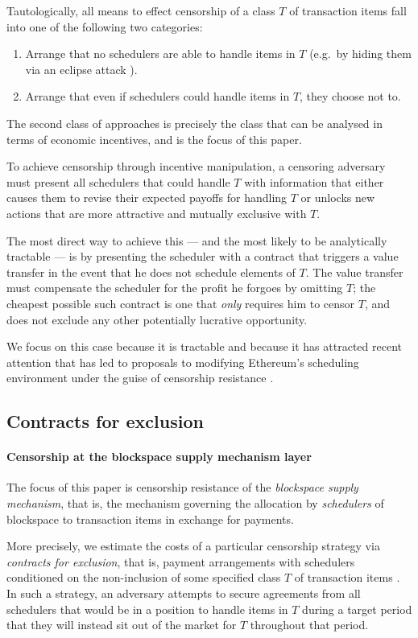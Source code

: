 Tautologically, all means to effect censorship of a class $T$ of transaction items fall into one of the following two categories:
%
\begin{enumerate}
  \item Arrange that no schedulers are able to handle items in $T$ (e.g.~by hiding them via an eclipse attack \cite{heilman2015eclipse}).
  \item Arrange that even if schedulers could handle items in $T$, they choose not to.
\end{enumerate}
%
The second class of approaches is precisely the class that can be analysed in terms of economic incentives, and is the focus of this paper.

To achieve censorship through incentive manipulation, a censoring adversary must present all schedulers that could handle $T$ with information that either causes them to revise their expected payoffs for handling $T$ or unlocks new actions that are more attractive and mutually exclusive with $T$.

The most direct way to achieve this --- and the most likely to be analytically tractable --- is by presenting the scheduler with a contract that triggers a value transfer in the event that he does not schedule elements of $T$.
%
The value transfer must compensate the scheduler for the profit he forgoes by omitting $T$; the cheapest possible such contract is one that \emph{only} requires him to censor $T$, and does not exclude any other potentially lucrative opportunity.

We focus on this case because it is tractable and because it has attracted recent attention \cite{FPR} that has led to proposals to modifying Ethereum's scheduling environment under the guise of censorship resistance \cite{burian2024censorship}.

\subsection{Contracts for exclusion}
\paragraph{Censorship at the blockspace supply mechanism layer}
The focus of this paper is censorship resistance of the \emph{blockspace supply mechanism}, that is, the mechanism governing the allocation by \emph{schedulers} of blockspace to transaction items in exchange for payments.

More precisely, we estimate the costs of a particular censorship strategy via \emph{contracts for exclusion}, that is, payment arrangements with schedulers conditioned on the non-inclusion of some specified class $T$ of transaction items \cite{FPR}.
%
In such a strategy, an adversary attempts to secure agreements from all schedulers that would be in a position to handle items in $T$ during a target period that they will instead sit out of the market for $T$ throughout that period.

